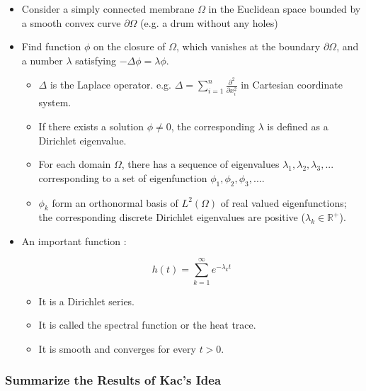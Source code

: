      \begin{itemize}     
       \item Consider a simply connected membrane $\Omega$ in the Euclidean space bounded by a smooth convex curve $\partial \Omega$ (e.g. a drum without any holes)
       \item Find function $\phi$ on the closure of $\Omega$, which vanishes at the boundary $\partial \Omega$, and a number $\lambda$ satisfying $-\Delta \phi = \lambda \phi$.

         \begin{itemize}
           \item $\Delta$ is the Laplace operator. e.g. $\Delta = \sum_{i=1}^{n} \frac{\partial ^2}{\partial x_i^2}$ in Cartesian coordinate system.
           \item If there exists a solution $\phi \neq 0$, the corresponding $\lambda$ is defined as a Dirichlet eigenvalue.
           \item For each domain $\Omega$, there has a sequence of eigenvalues $\lambda_1, \lambda_2, \lambda_3, ... $ corresponding to a set of eigenfunction $\phi_1, \phi_2, \phi_3, ...$.
           \item $\phi_k$ form an orthonormal basis of $L^2(\Omega)$ of real valued eigenfunctions; the corresponding discrete Dirichlet eigenvalues are positive ($\lambda_k \in \mathbb{R}^{+}$).
         \end{itemize}
         
       \item An important function \cite{grieser2013hearing}:

         \begin{equation}\label{eq:heat_trace}
           h(t) = \sum_{k=1}^{\infty} e^{-\lambda_kt}
         \end{equation}
         
         \begin{itemize}  
           \item It is a Dirichlet series.
           \item It is called the spectral function or the heat trace.
           \item It is smooth and converges for every $t>0$.
         \end{itemize}
     \end{itemize}



     \subsubsection{Summarize the Results of Kac's Idea}

